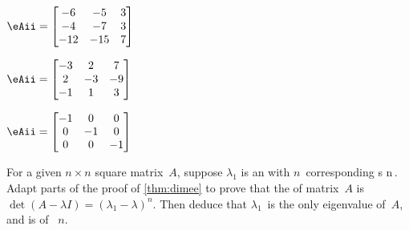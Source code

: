 \begin{exercise}
\begin{Parts}
\begin{reduce}
\item \(\eAii=\begin{bmatrix} -6 & -5 & 3
\\-4 & -7 & 3
\\-12 & -15 & 7 \end{bmatrix}\)
\end{reduce}

\item \(\eAii=\begin{bmatrix} -3 & 2 & 7
\\2 & -3 & -9
\\-1 & 1 & 3 \end{bmatrix}\)

\item \(\eAii=\begin{bmatrix} -1 & 0 & 0
\\0 & -1 & 0
\\0 & 0 & -1 \end{bmatrix}\)


\end{Parts}
\end{exercise}







\begin{exercise} \label{ex:dimme} 
For a given \(n\times n\) square matrix~\(A\), suppose \(\lambda_1\) is an  with \(n\)~corresponding  s \hlist\pv n\,.  
Adapt parts of the proof of \autoref{thm:dimee} to prove that the  of matrix~\(A\) is \(\det(A-\lambda I)=(\lambda_1-\lambda)^n\). 
Then deduce that \(\lambda_1\)~is the only eigenvalue of~\(A\), and is of ~\(n\).
\end{exercise}




